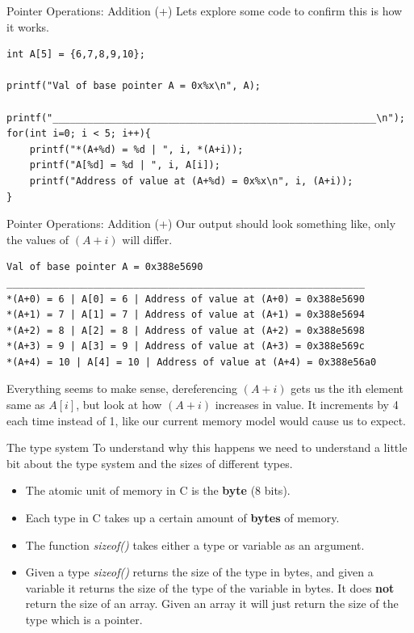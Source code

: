 \documentclass{beamer}
\begin{document}
\begin{frame}[fragile]{Pointer Operations: Addition (+)}
	Lets explore some code to confirm this is how it works.
\begin{verbatim}
int A[5] = {6,7,8,9,10};

printf("Val of base pointer A = 0x%x\n", A);

printf("________________________________________________________\n");
for(int i=0; i < 5; i++){
	printf("*(A+%d) = %d | ", i, *(A+i));
	printf("A[%d] = %d | ", i, A[i]);
	printf("Address of value at (A+%d) = 0x%x\n", i, (A+i));
}
\end{verbatim}
\end{frame}

\begin{frame}[fragile]{Pointer Operations: Addition (+)}
Our output should look something like, only the values of $(A+i)$ will differ.
\begin{verbatim}
Val of base pointer A = 0x388e5690
______________________________________________________________
*(A+0) = 6 | A[0] = 6 | Address of value at (A+0) = 0x388e5690
*(A+1) = 7 | A[1] = 7 | Address of value at (A+1) = 0x388e5694
*(A+2) = 8 | A[2] = 8 | Address of value at (A+2) = 0x388e5698
*(A+3) = 9 | A[3] = 9 | Address of value at (A+3) = 0x388e569c
*(A+4) = 10 | A[4] = 10 | Address of value at (A+4) = 0x388e56a0
\end{verbatim}
Everything seems to make sense, dereferencing $(A+i)$ gets us the ith element same as $A[i]$, but look at how $(A+i)$ increases in value. It increments by 4 each time instead of 1, like our current memory model would cause us to expect.
\end{frame}

\begin{frame}[fragile]{The type system}
To understand why this happens we need to understand a little bit about the type system and the sizes of different types.
\begin{itemize}
	\item The atomic unit of memory in C is the {\bf byte} (8 bits).
	\item Each type in C takes up a certain amount of {\bf bytes} of memory.
	\item The function {\it sizeof()} takes either a type or variable as an argument.
	\item Given a type {\it sizeof()} returns the size of the type in bytes, and given a variable it returns the size of the type of the variable in bytes. It does {\bf not} return the size of an array. Given an array it will just return the size of the type which is a pointer.
\end{itemize}
\end{frame}
\end{document}
